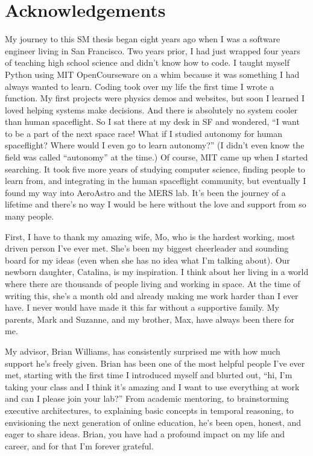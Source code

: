 \documentclass[12pt,vi,leftblank,twoside]{mitthesis}
\begin{document}
\cleardoublepage

\section*{Acknowledgements}

My journey to this SM thesis began eight years ago when I was a software engineer living in San
Francisco. Two years prior, I had just wrapped four years of teaching high school science and didn't
know how to code. I taught myself Python using MIT OpenCourseware on a whim because it was something
I had always wanted to learn. Coding took over my life the first time I wrote a function. My first
projects were physics demos and websites, but soon I learned I loved helping systems make decisions.
And there is absolutely no system cooler than human spaceflight. So I sat there at my desk in SF and
wondered, ``I want to be a part of the next space race! What if I studied autonomy for human
spaceflight? Where would I even go to learn autonomy?'' (I didn't even know the field was called
``autonomy'' at the time.) Of course, MIT came up when I started searching. It took five more years of
studying computer science, finding people to learn from, and integrating in the human spaceflight
community, but eventually I found my way into AeroAstro and the MERS lab. It's been the journey of a
lifetime and there's no way I would be here without the love and support from so many people.

First, I have to thank my amazing wife, Mo, who is the hardest working, most driven person I've ever
met. She's been my biggest cheerleader and sounding board for my ideas (even when she has no idea
what I'm talking about). Our newborn daughter, Catalina, is my inspiration. I think about her living
in a world where there are thousands of people living and working in space. At the time of writing
this, she's a month old and already making me work harder than I ever have. I never would have made
it this far without a supportive family. My parents, Mark and Suzanne, and my brother, Max, have
always been there for me.

My advisor, Brian Williams, has consistently surprised me with how much support he's freely given.
Brian has been one of the most helpful people I've ever met, starting with the first time I
introduced myself and blurted out, ``hi, I'm taking your class and I think it's amazing and I want to
use everything at work and can I please join your lab?'' From academic mentoring, to brainstorming
executive architectures, to explaining basic concepts in temporal reasoning, to envisioning the next
generation of online education, he's been open, honest, and eager to share ideas. Brian, you have
had a profound impact on my life and career, and for that I'm forever grateful.
\end{document}
